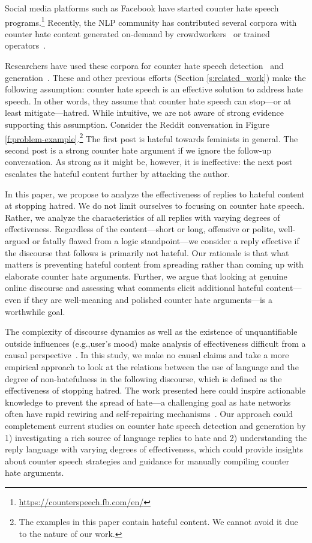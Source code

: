 \documentclass[11pt]{article}
\begin{document}
Social media platforms such as Facebook have started counter hate speech programs.\footnote{\url{https://counterspeech.fb.com/en/}} 
Recently, the NLP community has contributed several corpora with counter hate content
generated on-demand by crowdworkers~\cite{DBLP:conf/icwsm/MathewSTRSMG019,qian-etal-2019-benchmark} or trained operators~\cite{chung-etal-2019-conan}.

Researchers have used these corpora for counter hate speech detection~\cite{DBLP:conf/icwsm/MathewSTRSMG019} and generation~\cite{tekiroglu-etal-2020-generating,fanton-etal-2021-human,zhu-bhat-2021-generate}.
These and other previous efforts (Section \ref{s:related_work}) make the following assumption:
counter hate speech is an effective solution to address hate speech.
In other words, they assume that counter hate speech can stop---or at least mitigate---hatred.
While intuitive, we are not aware of strong evidence supporting this assumption.
Consider the Reddit conversation in Figure \ref{f:problem-example}.\footnote{The examples in this paper contain hateful content. We cannot avoid it due to the nature of our work.}
The first post is hateful towards feminists in general. 
The second post is a strong counter hate argument if we ignore the follow-up conversation.
As strong as it might be, however, it is ineffective: the next post escalates the hateful content further by attacking the author.

In this paper, we propose to analyze the effectiveness of replies to hateful content at stopping hatred.
We do not limit ourselves to focusing on counter hate speech. 
Rather, we analyze the characteristics of all replies with varying degrees of effectiveness. 
Regardless of the content---short or long, offensive or polite, well-argued or fatally flawed from a logic standpoint---we consider a reply effective if the discourse that follows is primarily not hateful.
Our rationale is that what matters is preventing hateful content from spreading rather than coming up with elaborate counter hate arguments.
Further, we argue that looking at genuine online discourse and assessing what comments elicit additional hateful content---even if they are well-meaning and polished counter hate arguments---is a worthwhile goal.

The complexity of discourse dynamics as well as the existence of unquantifiable outside influences (e.g.,user's mood) make analysis of effectiveness difficult from a causal perspective~\cite{garland2022impact}. 
In this study, we make no causal claims and take a more empirical approach to look at the relations between the use of language and the degree of non-hatefulness in the following discourse, which is defined as the effectiveness of stopping hatred. 
The work presented here could inspire actionable knowledge to prevent the spread of hate---a challenging goal as
hate networks often have rapid rewiring and self-repairing mechanisms~\cite{johnson2019hidden}.
Our approach could completement current studies on counter hate speech detection and generation by 1) investigating a rich source of language replies to hate and 2) understanding the reply language with varying degrees of effectiveness, which could provide insights about counter speech strategies and guidance for manually compiling counter hate arguments.
\end{document}
